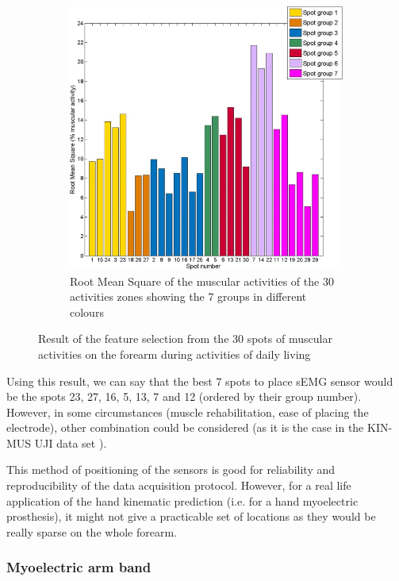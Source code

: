\documentclass{article}
\begin{document}
\begin{figure}[H]
		\begin{subfigure}{.45 \textwidth}
			\centering
			\includegraphics[width=1\linewidth]{images/forearmActivityZonesRMS.png}
			\caption{Root Mean Square of the muscular activities of the 30 activities zones showing the 7 groups in different colours}
			\label{fig:MRS}
		\end{subfigure}
		\caption{Result of the feature selection from the 30 spots of muscular activities on the forearm during activities of daily living \cite{ref:identifiedEMGlocation}}
	\end{figure}
	
	Using this result, we can say that the best 7 spots to place sEMG sensor would be the spots 23, 27, 16, 5, 13, 7 and 12 (ordered by their group number). However, in some circumstances (muscle rehabilitation, ease of placing the electrode), other combination could be considered (as it is the case in the KIN-MUS UJI data set \cite{ref:KinMusUji}).
	
	This method of positioning of the sensors is good for reliability and reproducibility of the data acquisition protocol. However, for a real life application of the hand kinematic prediction (i.e. for a hand myoelectric prosthesis), it might not give a practicable set of locations as they would be really sparse on the whole forearm.
	
	
	\subsubsection{Myoelectric arm band}
	
\end{document}
